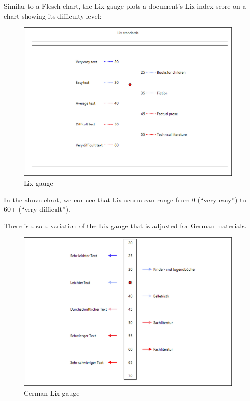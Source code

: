 \documentclass[
]{book}
\theoremstyle{definition}
\theoremstyle{definition}
\theoremstyle{definition}
\theoremstyle{definition}
\theoremstyle{remark}
\begin{document}
Similar to a Flesch chart, the Lix gauge plots a document's Lix index score on a chart showing its difficulty level:

\begin{figure}[H]

{\centering \includegraphics[width=0.75\linewidth,]{Images/LixGauge} 

}

\caption{Lix gauge}\label{fig:lixGuage2}
\end{figure}

In the above chart, we can see that Lix scores can range from 0 (``very easy'') to 60+ (``very difficult'').

There is also a variation of the Lix gauge that is adjusted for German materials:

\begin{figure}[H]

{\centering \includegraphics[width=0.75\linewidth,]{Images/GermanLixGauge} 

}

\caption{German Lix gauge}\label{fig:germanLixGauge}
\end{figure}
\end{document}
